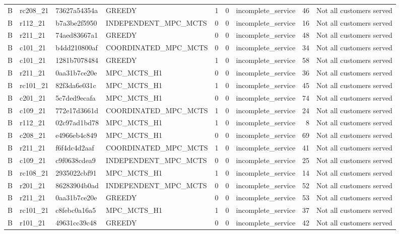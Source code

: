 \begin{table}
{\begin{tabular}{llllrrlrl}
B & rc208\_21 & 73627a54354a & GREEDY & 1 & 0 & incomplete\_service & 46 & Not all customers served \\
B & r112\_21 & b7a3be2f5950 & INDEPENDENT\_MPC\_MCTS & 0 & 0 & incomplete\_service & 16 & Not all customers served \\
B & r211\_21 & 74aed83667a1 & GREEDY & 0 & 0 & incomplete\_service & 48 & Not all customers served \\
B & c101\_21 & b4dd210800af & COORDINATED\_MPC\_MCTS & 0 & 0 & incomplete\_service & 34 & Not all customers served \\
B & c101\_21 & 1281b7078484 & GREEDY & 1 & 0 & incomplete\_service & 58 & Not all customers served \\
B & r211\_21 & 0aa31b7ce20e & MPC\_MCTS\_H1 & 0 & 0 & incomplete\_service & 36 & Not all customers served \\
B & rc101\_21 & 82f3da6e031c & MPC\_MCTS\_H1 & 1 & 0 & incomplete\_service & 45 & Not all customers served \\
B & c201\_21 & 5c7ded9ecafa & MPC\_MCTS\_H1 & 0 & 0 & incomplete\_service & 74 & Not all customers served \\
B & c109\_21 & 772e17d3661d & COORDINATED\_MPC\_MCTS & 1 & 0 & incomplete\_service & 24 & Not all customers served \\
B & r112\_21 & 02c97ad1bd78 & MPC\_MCTS\_H1 & 1 & 0 & incomplete\_service & 8 & Not all customers served \\
B & c208\_21 & e4966eb4c849 & MPC\_MCTS\_H1 & 0 & 0 & incomplete\_service & 69 & Not all customers served \\
B & r211\_21 & f6f4dc4d2aaf & COORDINATED\_MPC\_MCTS & 1 & 0 & incomplete\_service & 41 & Not all customers served \\
B & c109\_21 & c9f0638cdea9 & INDEPENDENT\_MPC\_MCTS & 0 & 0 & incomplete\_service & 25 & Not all customers served \\
B & rc108\_21 & 2935022cbf91 & MPC\_MCTS\_H1 & 1 & 0 & incomplete\_service & 14 & Not all customers served \\
B & r201\_21 & 86283904b0ad & INDEPENDENT\_MPC\_MCTS & 0 & 0 & incomplete\_service & 52 & Not all customers served \\
B & r211\_21 & 0aa31b7ce20e & GREEDY & 0 & 0 & incomplete\_service & 53 & Not all customers served \\
B & rc101\_21 & c8febc0a16a5 & MPC\_MCTS\_H1 & 1 & 0 & incomplete\_service & 37 & Not all customers served \\
B & r101\_21 & 49631cc39c48 & GREEDY & 0 & 0 & incomplete\_service & 42 & Not all customers served \\

\end{tabular}}
\end{table}
